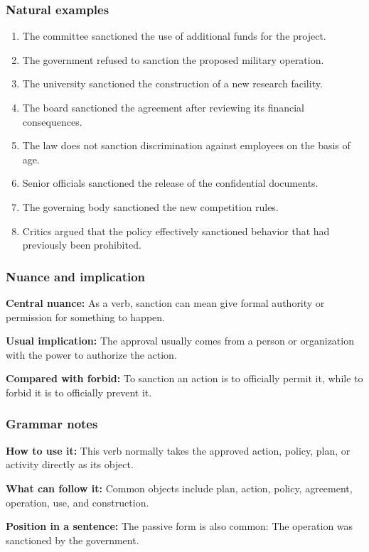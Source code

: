 \documentclass[11pt]{article}
\begin{document}
\subsubsection{Natural examples}
\begin{enumerate}
  \item The committee sanctioned the use of additional funds for the project.
  \item The government refused to sanction the proposed military operation.
  \item The university sanctioned the construction of a new research facility.
  \item The board sanctioned the agreement after reviewing its financial consequences.
  \item The law does not sanction discrimination against employees on the basis of age.
  \item Senior officials sanctioned the release of the confidential documents.
  \item The governing body sanctioned the new competition rules.
  \item Critics argued that the policy effectively sanctioned behavior that had previously been prohibited.
\end{enumerate}

\subsubsection{Nuance and implication}
\textbf{Central nuance:} As a verb, sanction can mean give formal authority or permission for something to happen.

\textbf{Usual implication:} The approval usually comes from a person or organization with the power to authorize the action.

\textbf{Compared with forbid:} To sanction an action is to officially permit it, while to forbid it is to officially prevent it.

\subsubsection{Grammar notes}
\textbf{How to use it:} This verb normally takes the approved action, policy, plan, or activity directly as its object.

\textbf{What can follow it:} Common objects include plan, action, policy, agreement, operation, use, and construction.

\textbf{Position in a sentence:} The passive form is also common: The operation was sanctioned by the government.
\end{document}
